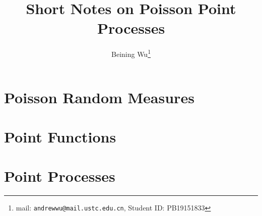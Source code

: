\documentclass[8pt,onesided]{article}
\begin{document}
{
\title{\mc  Short Notes on Poisson Point Processes\vspace*{.5em}}
\author{Beining Wu\footnote{mail: \texttt{andrewwu@mail.ustc.edu.cn}, Student ID: PB19151833}}
\maketitle
}

\section{Poisson Random Measures}

\section{Point Functions}

\section{Point Processes}
\end{document}
